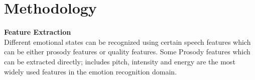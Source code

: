 \section{Methodology}
\textbf{{\Large Feature Extraction}}\\
Different emotional states can be recognized using certain speech features which can be either prosody features or quality features. Some Prosody features which can be extracted directly; includes pitch, intensity and energy are the most widely used features in the emotion recognition domain. 